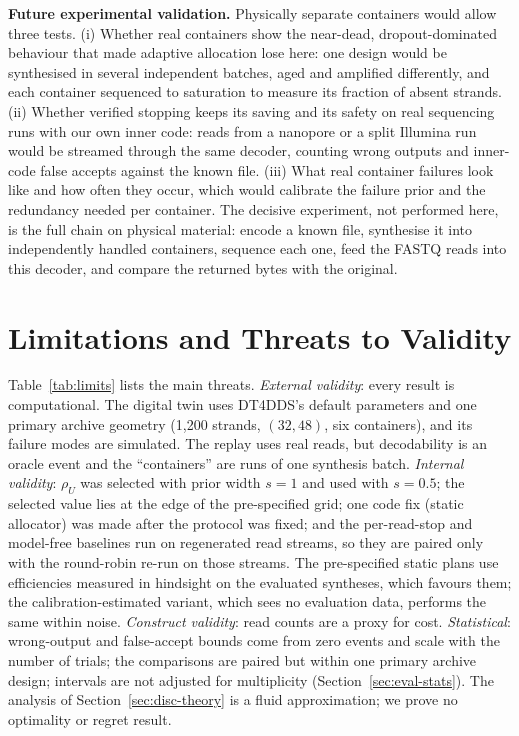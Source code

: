 \documentclass[acmsmall,screen]{acmart}
\begin{document}
\textbf{Future experimental validation.}\label{sec:wetlab}  Physically separate containers would allow
three tests.  (i) Whether real containers show the near-dead, dropout-dominated behaviour that made
adaptive allocation lose here: one design would be synthesised in several independent batches, aged and
amplified differently, and each container sequenced to saturation to measure its fraction of absent
strands.  (ii) Whether verified stopping keeps its saving and its safety on real sequencing runs with our
own inner code: reads from a nanopore or a split Illumina run would be streamed through the same decoder,
counting wrong outputs and inner-code false accepts against the known file.  (iii) What real container
failures look like and how often they occur, which would calibrate the failure prior and the redundancy
needed per container.  The decisive experiment, not performed here, is the full chain on physical
material: encode a known file, synthesise it into independently handled containers, sequence each one,
feed the FASTQ reads into this decoder, and compare the returned bytes with the original.

\section{Limitations and Threats to Validity}\label{sec:limits}
Table~\ref{tab:limits} lists the main threats.  \emph{External validity}: every result is
computational.  The digital twin uses DT4DDS's default parameters and one primary archive geometry
(1{,}200 strands, $(32,48)$, six containers), and its failure modes are simulated.  The replay uses real
reads, but decodability is an oracle event and the ``containers'' are runs of one synthesis batch.
\emph{Internal validity}: $\rho_U$ was selected with prior width $s{=}1$ and used with $s{=}0.5$; the
selected value lies at the edge of the pre-specified grid; one code fix (static allocator) was made after
the protocol was fixed; and the per-read-stop and model-free baselines run on regenerated read streams,
so they are paired only with the round-robin re-run on those streams.  The pre-specified static plans use
efficiencies measured in hindsight on the evaluated syntheses, which favours them; the
calibration-estimated variant, which sees no evaluation data, performs the same within noise.
\emph{Construct validity}: read counts are a proxy for cost.  \emph{Statistical}: wrong-output and
false-accept bounds come from zero events and scale with the number of trials; the comparisons are
paired but within one primary archive design; intervals are not adjusted for multiplicity
(Section~\ref{sec:eval-stats}).  The analysis of Section~\ref{sec:disc-theory} is a fluid approximation;
we prove no optimality or regret result.

\end{document}

